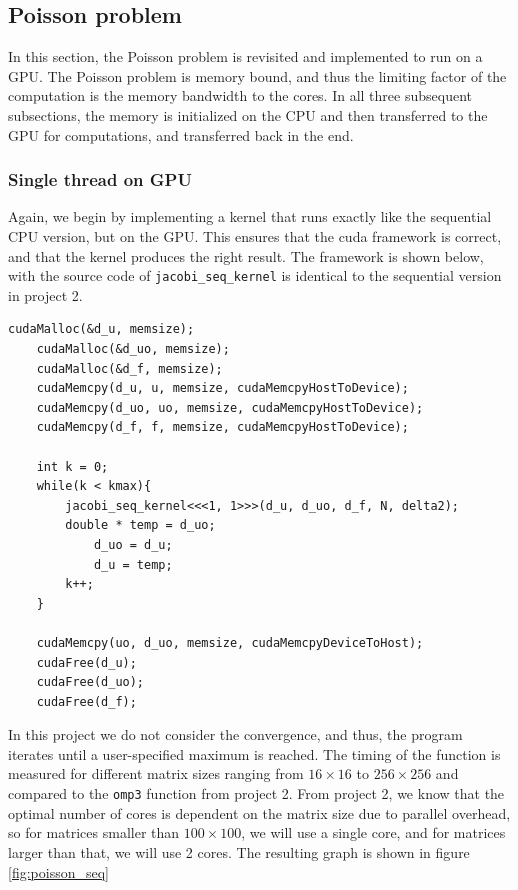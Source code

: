 \subsection{Poisson problem}
In this section, the Poisson problem is revisited and implemented to run on a GPU. The Poisson problem is memory bound, and thus the limiting factor of the computation is the memory bandwidth to the cores. In all three subsequent subsections, the memory is initialized on the CPU and then transferred to the GPU for computations, and transferred back in the end.

\subsubsection{Single thread on GPU}
Again, we begin by implementing a kernel that runs exactly like the sequential CPU version, but on the GPU. This ensures that the cuda framework is correct, and that the kernel produces the right result. The framework is shown below, with the source code of \texttt{jacobi\_seq\_kernel} is identical to the sequential version in project 2. 

\begin{lstlisting}
cudaMalloc(&d_u, memsize);
	cudaMalloc(&d_uo, memsize);
	cudaMalloc(&d_f, memsize);	
	cudaMemcpy(d_u, u, memsize, cudaMemcpyHostToDevice);
	cudaMemcpy(d_uo, uo, memsize, cudaMemcpyHostToDevice);
	cudaMemcpy(d_f, f, memsize, cudaMemcpyHostToDevice);

	int k = 0;
	while(k < kmax){
		jacobi_seq_kernel<<<1, 1>>>(d_u, d_uo, d_f, N, delta2);
		double * temp = d_uo;
    		d_uo = d_u;
    		d_u = temp;
		k++;
	}

	cudaMemcpy(uo, d_uo, memsize, cudaMemcpyDeviceToHost);
	cudaFree(d_u);
	cudaFree(d_uo);
	cudaFree(d_f);
\end{lstlisting}
In this project we do not consider the convergence, and thus, the program iterates until a user-specified maximum is reached. The timing of the function is measured for different matrix sizes ranging from $16\times 16$ to $256\times 256$ and compared to the \texttt{omp3} function from project 2. From project 2, we know that the optimal number of cores is dependent on the matrix size due to parallel overhead, so for matrices smaller than $100 \times 100$, we will use a single core, and for matrices larger than that, we will use 2 cores. The resulting graph is shown in figure \ref{fig:poisson_seq}

